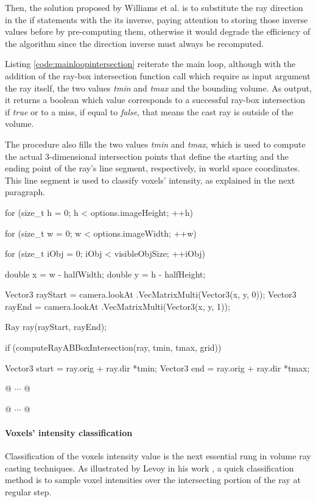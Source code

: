 \documentclass[12pt,a4paper]{extarticle}
\newcommand{\linespace}{\vspace{8pt}}
\begin{document}
Then, the solution proposed by Williams et al. \cite{Williams:2005} is to substitute the ray direction in the if statements with the its inverse, paying attention to storing those inverse values before by pre-computing them, otherwise it would degrade the efficiency of the algorithm since the direction inverse must always be recomputed. 
\linespace 

Listing \ref{code:mainloopintersection} reiterate the main loop, although with the addition of the ray-box intersection function call which require as input argument the ray itself, the two values \textit{tmin} and \textit{tmax} and the bounding volume. As output, it returns a boolean which value corresponds to a successful ray-box intersection if \emph{true} or to a miss, if equal to \emph{false}, that means the cast ray is outside of the volume.

The procedure also fills the two values \textit{tmin} and \textit{tmax}, which is used to compute the actual 3-dimensional intersection points that define the starting and the ending point of the ray's line segment, respectively, in world space coordinates.
This line segment is used to classify voxels' intensity, as explained in the next paragraph.

\begin{cpp}[caption={Ray casting main loop enriched with ray-box intersection checking statement and ray starting and ending points},label=code:mainloopintersection]
for (size_t h = 0; h < options.imageHeight; ++h) {
	for (size_t w = 0; w < options.imageWidth; ++w) {
		for (size_t iObj = 0; iObj < visibleObjSize; ++iObj) {
			double x = w - halfWidth;
			double y = h - halfHeight;

			Vector3 rayStart = camera.lookAt
						.VecMatrixMulti(Vector3(x, y, 0));
			Vector3 rayEnd = camera.lookAt
						.VecMatrixMulti(Vector3(x, y, 1));

			Ray ray(rayStart, rayEnd);

			if (computeRayABBoxIntersection(ray, tmin, tmax, grid)) {
				Vector3 start = ray.orig + ray.dir *tmin;
				Vector3 end = ray.orig + ray.dir *tmax;
				
				@ $\cdots$ @
			}
			@ $\cdots$ @
		}
	}
}
\end{cpp}
\paragraph{Voxels' intensity classification} Classification of the voxels intensity value is the next essential rung in volume ray casting techniques. As illustrated by Levoy in his work \cite{levoy_1988:4}, a quick classification method is to sample voxel intensities over the intersecting portion of the ray at regular step.
\end{document}
